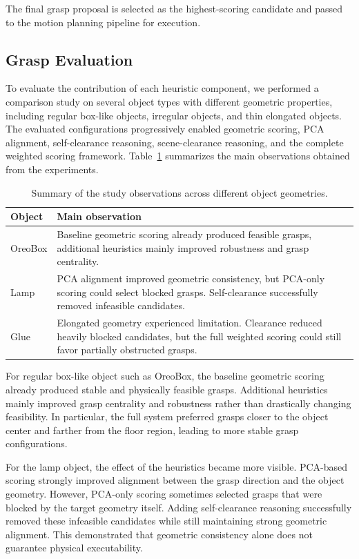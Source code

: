 \documentclass[conference,letterpaper,10pt]{IEEEtran}
\begin{document}
The final grasp proposal is selected as the highest-scoring candidate and passed to the motion planning pipeline for execution.

\subsection{Grasp Evaluation}

To evaluate the contribution of each heuristic component, we performed a comparison study on several object types with different geometric properties, including regular box-like objects, irregular objects, and thin elongated objects. The evaluated configurations progressively enabled geometric scoring, PCA alignment, self-clearance reasoning, scene-clearance reasoning, and the complete weighted scoring framework. Table~\ref{tab:ablation} summarizes the main observations obtained from the experiments.

\begin{table}[!t]
\caption{Summary of the study observations across different object geometries.}
\label{tab:ablation}
\centering
\renewcommand{\arraystretch}{1.15}
\begin{tabular}{p{2.1cm} p{5.2cm}}
\toprule
Object & Main observation \\
\midrule
OreoBox & Baseline geometric scoring already produced feasible grasps, additional heuristics mainly improved robustness and grasp centrality. \\
\midrule
Lamp & PCA alignment improved geometric consistency, but PCA-only scoring could select blocked grasps. Self-clearance successfully removed infeasible candidates. \\
\midrule
Glue &  Elongated geometry experienced limitation. Clearance reduced heavily blocked candidates, but the full weighted scoring could still favor partially obstructed grasps. \\
\bottomrule
\end{tabular}
\end{table}

For regular box-like object such as OreoBox, the baseline geometric scoring already produced stable and physically feasible grasps. Additional heuristics mainly improved grasp centrality and robustness rather than drastically changing feasibility. In particular, the full system preferred grasps closer to the object center and farther from the floor region, leading to more stable grasp configurations.

For the lamp object, the effect of the heuristics became more visible. PCA-based scoring strongly improved alignment between the grasp direction and the object geometry. However, PCA-only scoring sometimes selected grasps that were blocked by the target geometry itself. Adding self-clearance reasoning successfully removed these infeasible candidates while still maintaining strong geometric alignment. This demonstrated that geometric consistency alone does not guarantee physical executability.
\end{document}
